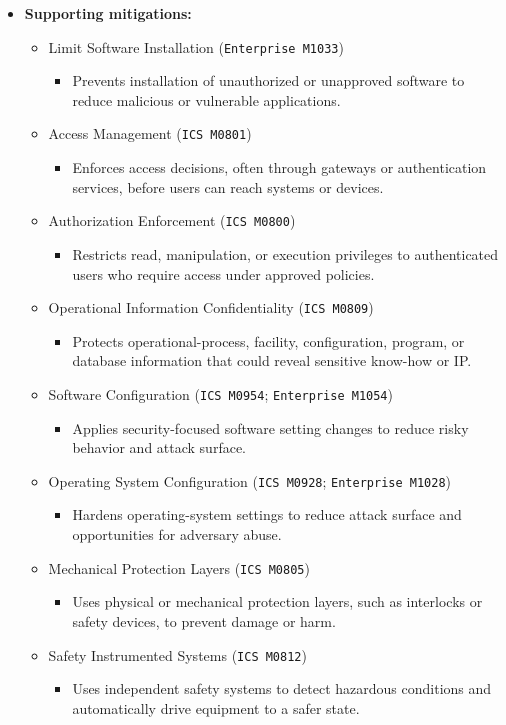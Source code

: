 \documentclass[10pt,a4paper,oneside]{report}
\begin{document}
\begin{itemize}
\item \textbf{Supporting mitigations:}
\begin{itemize}
\item Limit Software Installation (\texttt{Enterprise M1033})
\begin{itemize}
\item Prevents installation of unauthorized or unapproved software to reduce malicious or vulnerable applications.
\end{itemize}
\item Access Management (\texttt{ICS M0801})
\begin{itemize}
\item Enforces access decisions, often through gateways or authentication services, before users can reach systems or devices.
\end{itemize}
\item Authorization Enforcement (\texttt{ICS M0800})
\begin{itemize}
\item Restricts read, manipulation, or execution privileges to authenticated users who require access under approved policies.
\end{itemize}
\item Operational Information Confidentiality (\texttt{ICS M0809})
\begin{itemize}
\item Protects operational-process, facility, configuration, program, or database information that could reveal sensitive know-how or IP.
\end{itemize}
\item Software Configuration (\texttt{ICS M0954}; \texttt{Enterprise M1054})
\begin{itemize}
\item Applies security-focused software setting changes to reduce risky behavior and attack surface.
\end{itemize}
\item Operating System Configuration (\texttt{ICS M0928}; \texttt{Enterprise M1028})
\begin{itemize}
\item Hardens operating-system settings to reduce attack surface and opportunities for adversary abuse.
\end{itemize}
\item Mechanical Protection Layers (\texttt{ICS M0805})
\begin{itemize}
\item Uses physical or mechanical protection layers, such as interlocks or safety devices, to prevent damage or harm.
\end{itemize}
\item Safety Instrumented Systems (\texttt{ICS M0812})
\begin{itemize}
\item Uses independent safety systems to detect hazardous conditions and automatically drive equipment to a safer state.
\end{itemize}
\end{itemize}
\end{itemize}
\end{document}
